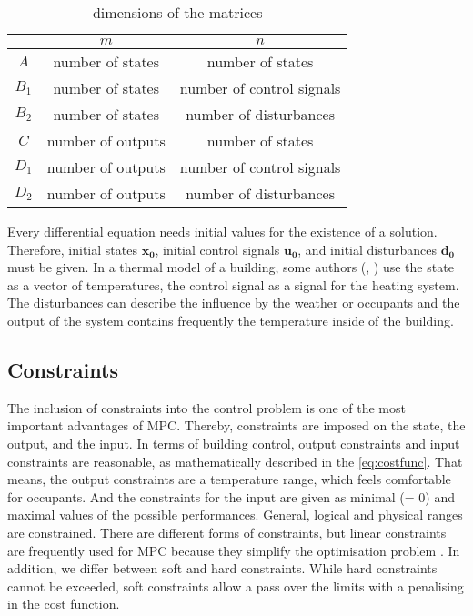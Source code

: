     \begin{table}[]
        \centering
        \begin{tabular}{c|c|c}
            & $m$ & $n$  \\
            \hline
            $A$ & number of states & number of states\\
            $B_\text{1}$ & number of states & number of control signals\\
            $B_\text{2}$ & number of states & number of disturbances\\
            $C$ & number of outputs & number of states\\
            $D_\text{1}$ & number of outputs & number of control signals\\
            $D_\text{2}$ & number of outputs & number of disturbances\\
        \end{tabular}
        \caption{dimensions of the matrices}
        \label{tab:matrixDim}
    \end{table}
    Every differential equation needs initial values for the existence of a solution. Therefore, initial states $\mathbf{x_0}$, initial control signals $\mathbf{u_0}$, and initial disturbances $\mathbf{d_0}$ must be given.
    In a thermal model of a building, some authors (\cite{Hazyuk.2012}, \cite{Siroky.2011}) use the state as a vector of temperatures, the control signal as a signal for the heating system. The disturbances can describe the influence by the weather or occupants and the output of the system contains frequently the temperature inside of the building.
    


\subsection{Constraints}
\label{subsection:constraints}

The inclusion of constraints into the control problem is one of the most important advantages of MPC. Thereby, constraints are imposed on the state, the output, and the input. In terms of building control, output constraints and input constraints are reasonable, as mathematically described in the \autoref{eq:costfunc}. That means, the output constraints are a temperature range, which feels comfortable for occupants. And the constraints for the input are given as minimal (= 0) and maximal values of the possible performances. General, logical and physical ranges are constrained. There are different forms of constraints, but linear constraints are frequently used for MPC because they simplify the optimisation problem \cite{Siroky.2011}. In addition, we differ between soft and hard constraints. While hard constraints cannot be exceeded, soft constraints allow a pass over the limits with a penalising in the cost function.

